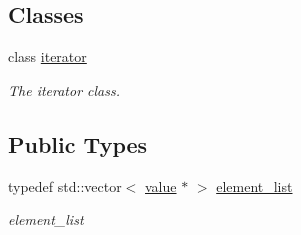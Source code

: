 \subsection*{Classes}
\begin{DoxyCompactItemize}
\item 
class \hyperlink{classformat_1_1array_1_1iterator}{iterator}
\begin{DoxyCompactList}\small\item\em The iterator class. \end{DoxyCompactList}\end{DoxyCompactItemize}
\subsection*{Public Types}
\begin{DoxyCompactItemize}
\item 
typedef std\+::vector$<$ \hyperlink{classformat_1_1value_aa6b85823936bf7b8ab78d3f8d443c00d}{value} $\ast$ $>$ \hyperlink{classformat_1_1array_a7167dd5489c3b9baeff3c937523f2a00}{element\+\_\+list}\hypertarget{classformat_1_1array_a7167dd5489c3b9baeff3c937523f2a00}{}\label{classformat_1_1array_a7167dd5489c3b9baeff3c937523f2a00}

\begin{DoxyCompactList}\small\item\em element\+\_\+list \end{DoxyCompactList}\end{DoxyCompactItemize}
